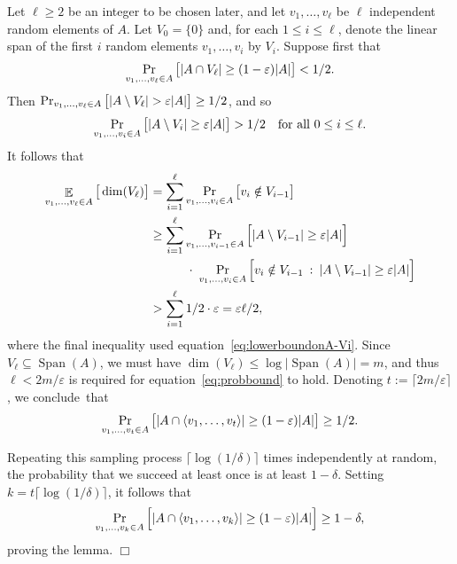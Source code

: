 \documentclass[11pt]{amsart}
\renewcommand{\Pr}{\mathop{\mbox{\rm Pr}}}
\newcommand{\Exp}{\mathop{\mathbb{E}}}
\DeclareMathOperator{\vspan}{Span} %
\theoremstyle{plain}
\theoremstyle{definition}
\theoremstyle{remark}
\renewenvironment{proof}[1][]{
    	\begin{trivlist}
     	\item[\hspace{\labelsep}{\em\noindent Proof#1:\/}]}
     	{{\hfill$\Box$}
    	\end{trivlist}
  }
\begin{document}
\begin{proof}
Let $\ell \geq 2$ be an integer to be chosen later, and let $v_1, \dots, v_\ell$ be $\ell$ independent random elements of $A$.
Let $V_0 = \{0\}$ and, for each $1\leq i\leq \ell$, denote the linear span of the first $i$ random elements $v_1, \dots, v_i$ by $V_i$. Suppose first that
\begin{equation}
\label{eq:probbound}
    \Pr_{v_1, \dots, v_\ell\in A}\big[|A\cap V_\ell| \geq (1-\varepsilon) |A|\big] < 1/2.
\end{equation}
Then $\Pr_{v_1, \dots, v_\ell\in A}\big[|A\setminus V_\ell| > \varepsilon |A|\big] \geq 1/2$, and so
\begin{align}
    \label{eq:lowerboundonA-Vi}
    \Pr_{v_1, \dots, v_i\in A}\big[|A\setminus V_i| \geq \varepsilon |A|\big] > 1/2 \quad \text{for all $0\leq i \leq \ell$.}
\end{align}
It follows that
\begin{align*}
    \Exp_{v_1, \dots, v_\ell\in A} \big[\dim(V_\ell)\big] &= \sum_{i=1}^\ell \Pr_{v_1, \dots, v_i\in A}\big[v_i \notin V_{i-1}\big] \\
    &\geq \sum_{i=1}^\ell \Pr_{v_1, \dots, v_{i-1}\in A}\Big[|A\setminus V_{i-1}| \geq \varepsilon |A|\Big]\\
    &\qquad\quad \cdot \hspace{1mm} \Pr_{v_1, \dots, v_i\in A}\Big[v_i \notin V_{i-1}\: :\: |A\setminus V_{i-1}| \geq \varepsilon |A|\Big] \\
    &> \sum_{i=1}^\ell 1/2 \cdot \varepsilon
    = \varepsilon \ell/2,
\end{align*}
where the final inequality used equation~\eqref{eq:lowerboundonA-Vi}. 
Since $V_\ell \subseteq \vspan(A)$, we must have $\dim(V_\ell) \leq \log |\vspan(A)| = m$, and thus $\ell < 2m/\varepsilon$ is required for equation~\eqref{eq:probbound} to hold. Denoting $t := \lceil 2m/\varepsilon\rceil$, we conclude~that
\begin{equation*}
    \Pr_{v_1, \dots, v_t\in A}\big[|A\cap \langle v_1, \dots, v_t\rangle| \geq (1-\varepsilon) |A|\big] \geq 1/2.
\end{equation*}

Repeating this sampling process $\lceil\log(1/\delta)\rceil$ times independently at random, the probability that we succeed at least once is at least $1-\delta$.
Setting $k = t \lceil\log(1/\delta)\rceil$, it follows that
$$
\Pr_{v_1, \dots, v_k\in A}\Big[|A\cap \langle v_1, \dots, v_k\rangle| \geq (1-\varepsilon) |A|\Big] \geq 1-\delta,
$$
proving the lemma.
\end{proof}
\end{document}
